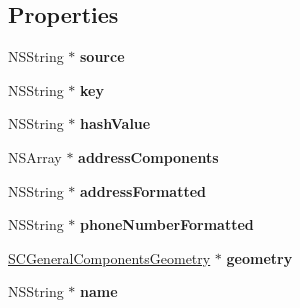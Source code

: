 \subsection*{Properties}
\begin{DoxyCompactItemize}
\item 
N\+S\+String $\ast$ {\bfseries source}\hypertarget{interface_s_c_general_public_merchant_adede9c810b4386db92c3eb04af30a1ef}{}\label{interface_s_c_general_public_merchant_adede9c810b4386db92c3eb04af30a1ef}

\item 
N\+S\+String $\ast$ {\bfseries key}\hypertarget{interface_s_c_general_public_merchant_a1eb578bc7b656b74761a82e88a778322}{}\label{interface_s_c_general_public_merchant_a1eb578bc7b656b74761a82e88a778322}

\item 
N\+S\+String $\ast$ {\bfseries hash\+Value}\hypertarget{interface_s_c_general_public_merchant_a50135efce338b71b653fe4a4f0a1fdf6}{}\label{interface_s_c_general_public_merchant_a50135efce338b71b653fe4a4f0a1fdf6}

\item 
N\+S\+Array $\ast$ {\bfseries address\+Components}\hypertarget{interface_s_c_general_public_merchant_a9b8a1bf6e4241dece3b45ab0d4032965}{}\label{interface_s_c_general_public_merchant_a9b8a1bf6e4241dece3b45ab0d4032965}

\item 
N\+S\+String $\ast$ {\bfseries address\+Formatted}\hypertarget{interface_s_c_general_public_merchant_ae454fbf9c218308381825e6fe17fd919}{}\label{interface_s_c_general_public_merchant_ae454fbf9c218308381825e6fe17fd919}

\item 
N\+S\+String $\ast$ {\bfseries phone\+Number\+Formatted}\hypertarget{interface_s_c_general_public_merchant_aab0e0300034be91d4aafe3843e70cd66}{}\label{interface_s_c_general_public_merchant_aab0e0300034be91d4aafe3843e70cd66}

\item 
\hyperlink{interface_s_c_general_components_geometry}{S\+C\+General\+Components\+Geometry} $\ast$ {\bfseries geometry}\hypertarget{interface_s_c_general_public_merchant_aeed3d231be4a1481e776a2fbe06cf0d9}{}\label{interface_s_c_general_public_merchant_aeed3d231be4a1481e776a2fbe06cf0d9}

\item 
N\+S\+String $\ast$ {\bfseries name}\hypertarget{interface_s_c_general_public_merchant_aeaf97c75de6c72bab8e387aa92ce3d33}{}\label{interface_s_c_general_public_merchant_aeaf97c75de6c72bab8e387aa92ce3d33}


\end{DoxyCompactItemize}
